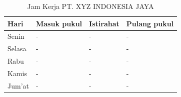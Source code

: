 \begin{table}[ht!]
    \centering
    \begin{tabular}{|l|l|l|l|}
        \hline
        \textbf{Hari} & \textbf{Masuk pukul} & \textbf{Istirahat} & \textbf{Pulang pukul} \\ \hline
        Senin         & -                    & -                  & -                     \\ \hline
        Selasa        & -                    & -                  & -                     \\ \hline
        Rabu          & -                    & -                  & -                     \\ \hline
        Kamis         & -                    & -                  & -                     \\ \hline
        Jum'at        & -                    & -                  & -                     \\ \hline
    \end{tabular}
    \caption{Jam Kerja PT. XYZ INDONESIA JAYA}
    \label{tab:workingDays}
\end{table}